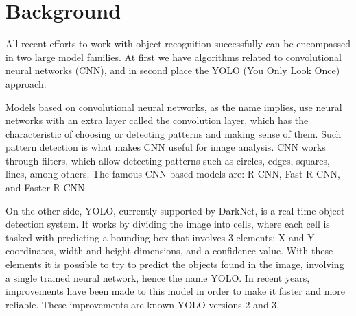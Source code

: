 \section{Background}

All recent efforts to work with object recognition successfully can be 
encompassed in two large model families. At first we have algorithms 
related to convolutional neural networks (CNN), and  in second place  the YOLO 
(You Only Look Once) approach.

Models based on convolutional neural networks, as the name implies, use neural 
networks with an extra layer called the convolution layer, which has the 
characteristic of choosing or detecting patterns and making sense of them. 
Such pattern detection is what makes CNN useful for image analysis. CNN works 
through filters, which allow detecting patterns such as circles, edges, squares, 
lines, among others. The famous CNN-based models are: R-CNN, Fast R-CNN, and 
Faster R-CNN.

On the other side, YOLO, currently supported by DarkNet, is a real-time object 
detection system. It works by dividing the image into cells, where each cell is 
tasked with predicting a bounding box that involves 3 elements: X and Y 
coordinates, width and height dimensions, and a confidence value. With these 
elements it is possible to try to predict the objects found in the image, 
involving a single trained neural network, hence the name YOLO. In recent years, 
improvements have been made to this model in order to make it faster and more 
reliable. These improvements are known YOLO versions 2 and 3.

